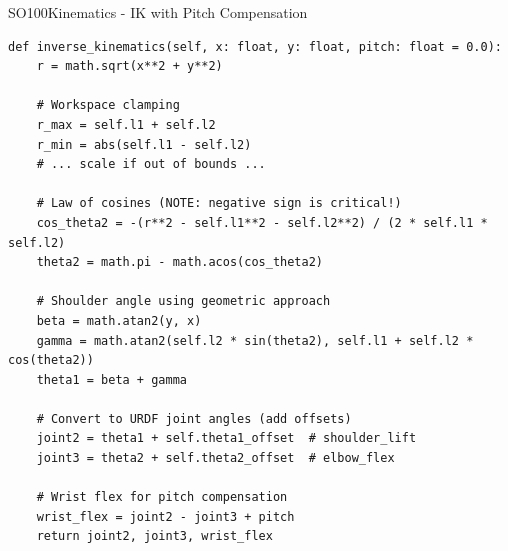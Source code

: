\begin{frame}[fragile]{SO100Kinematics - IK with Pitch Compensation}
\begin{lstlisting}
def inverse_kinematics(self, x: float, y: float, pitch: float = 0.0):
    r = math.sqrt(x**2 + y**2)

    # Workspace clamping
    r_max = self.l1 + self.l2
    r_min = abs(self.l1 - self.l2)
    # ... scale if out of bounds ...

    # Law of cosines (NOTE: negative sign is critical!)
    cos_theta2 = -(r**2 - self.l1**2 - self.l2**2) / (2 * self.l1 * self.l2)
    theta2 = math.pi - math.acos(cos_theta2)

    # Shoulder angle using geometric approach
    beta = math.atan2(y, x)
    gamma = math.atan2(self.l2 * sin(theta2), self.l1 + self.l2 * cos(theta2))
    theta1 = beta + gamma

    # Convert to URDF joint angles (add offsets)
    joint2 = theta1 + self.theta1_offset  # shoulder_lift
    joint3 = theta2 + self.theta2_offset  # elbow_flex

    # Wrist flex for pitch compensation
    wrist_flex = joint2 - joint3 + pitch
    return joint2, joint3, wrist_flex
\end{lstlisting}
\end{frame}

